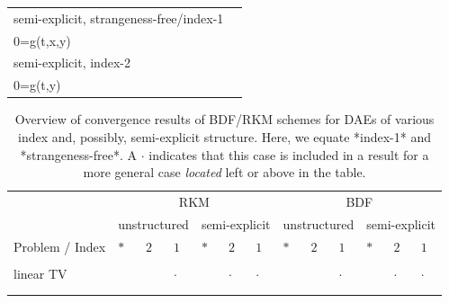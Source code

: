 \documentclass[]{book}
\theoremstyle{definition}
\theoremstyle{definition}
\theoremstyle{definition}
\theoremstyle{remark}
\begin{document}
\begin{longtable}[]{@{}ll@{}}
\begin{minipage}[t]{0.58\columnwidth}
semi-explicit, strangeness-free/index-1\strut
\end{minipage} & \begin{minipage}[t]{0.36\columnwidth}\raggedright
\(\begin{cases}\dot x= f(t, x, y) \\ 0=g(t,x,y) \end{cases}\)\strut
\end{minipage}\tabularnewline
\begin{minipage}[t]{0.58\columnwidth}\raggedright
semi-explicit, index-2\strut
\end{minipage} & \begin{minipage}[t]{0.36\columnwidth}\raggedright
\(\begin{cases}\dot x= f(t, x, y) \\ 0=g(t,y) \end{cases}\)\strut
\end{minipage}\tabularnewline
\bottomrule
\end{longtable}

\begin{table}

\caption{\label{tab:unnamed-chunk-1}Overview of convergence results of BDF/RKM schemes for DAEs of various index and, possibly, semi-explicit structure. Here, we equate *index-1* and *strangeness-free*. A $\cdot$ indicates that this case is included in a result for a more general case \emph{located} left or above in the table.}
\centering
\begin{tabular}[t]{lllllllllllll}
\toprule
\multicolumn{1}{c}{ } & \multicolumn{6}{c}{RKM} & \multicolumn{6}{c}{BDF} \\
\cmidrule(l{3pt}r{3pt}){2-7} \cmidrule(l{3pt}r{3pt}){8-13}
\multicolumn{1}{c}{ } & \multicolumn{3}{c}{unstructured} & \multicolumn{3}{c}{semi-explicit} & \multicolumn{3}{c}{unstructured} & \multicolumn{3}{c}{semi-explicit} \\
\cmidrule(l{3pt}r{3pt}){2-4} \cmidrule(l{3pt}r{3pt}){5-7} \cmidrule(l{3pt}r{3pt}){8-10} \cmidrule(l{3pt}r{3pt}){11-13}{}
Problem / Index & $*$ & $2$ & $1$ & $*$ & $2$ & $1$ & $*$ & $2$ & $1$ & $*$ & $2$ & $1$\\
\midrule{}
\cellcolor{gray!6}{nonlinear} & \cellcolor{gray!6}{} & \cellcolor{gray!6}{} & \cellcolor{gray!6}{c} & \cellcolor{gray!6}{} & \cellcolor{gray!6}{g,i} & \cellcolor{gray!6}{b} & \cellcolor{gray!6}{} & \cellcolor{gray!6}{} & \cellcolor{gray!6}{f} & \cellcolor{gray!6}{} & \cellcolor{gray!6}{h} & \cellcolor{gray!6}{e}\\
linear TV &  &  & $\cdot$ &  & $\cdot$ & $\cdot$ &  &  & $\cdot$ &  & $\cdot$ & $\cdot$\\
\cellcolor{gray!6}{linear CC} & \cellcolor{gray!6}{a} & \cellcolor{gray!6}{$\cdot$} & \cellcolor{gray!6}{$\cdot$} & \cellcolor{gray!6}{$\cdot$} & \cellcolor{gray!6}{$\cdot$} & \cellcolor{gray!6}{$\cdot$} & \cellcolor{gray!6}{d} & \cellcolor{gray!6}{$\cdot$} & \cellcolor{gray!6}{$\cdot$} & \cellcolor{gray!6}{$\cdot$} & \cellcolor{gray!6}{$\cdot$} & \cellcolor{gray!6}{$\cdot$}\\
\bottomrule{}
\end{tabular}
\end{table}
\end{document}
